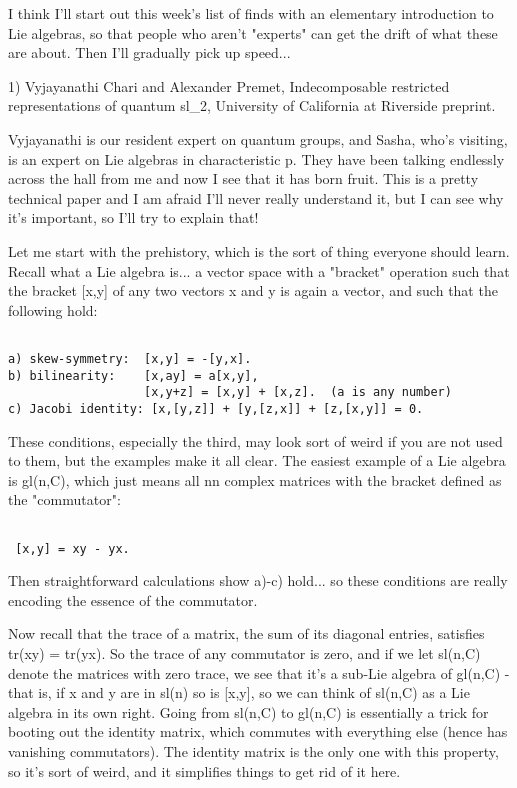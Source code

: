 

I think I'll start out this week's list of finds with an elementary
introduction to Lie algebras, so that people who aren't "experts" can
get the drift of what these are about.  Then I'll gradually pick up
speed...

1) Vyjayanathi Chari and Alexander Premet, Indecomposable restricted
representations of quantum sl_{2}, University of California at
Riverside preprint.

Vyjayanathi is our resident expert on quantum groups, and Sasha, who's
visiting, is an expert on Lie algebras in characteristic p.  They have
been talking endlessly across the hall from me and now I see that it has
born fruit.  This is a pretty technical paper and I am afraid I'll never
really understand it, but I can see why it's important, so I'll try to 
explain that!  

Let me start with the prehistory, which is the sort of thing everyone
should learn.  Recall what a Lie algebra is... a vector space
with a "bracket" operation such that the bracket [x,y] of any two vectors
x and y is again a vector, and such that the following hold:


\begin{verbatim}

a) skew-symmetry:  [x,y] = -[y,x].
b) bilinearity:    [x,ay] = a[x,y],  
                   [x,y+z] = [x,y] + [x,z].  (a is any number) 
c) Jacobi identity: [x,[y,z]] + [y,[z,x]] + [z,[x,y]] = 0.
\end{verbatim}
    

These conditions, especially the third, may look sort of weird if you
are not used to them, but the examples make it all clear.  The easiest
example of a Lie algebra is gl(n,C), which just means all n\times n complex
matrices with the bracket defined as the "commutator":


\begin{verbatim}

 [x,y] = xy - yx.  
\end{verbatim}
    

Then straightforward calculations show a)-c) hold... so these conditions
are really encoding the essence of the commutator.  

Now recall that the trace of a matrix, the sum of its diagonal entries,
satisfies tr(xy) = tr(yx).  So the trace of any commutator is zero, and
if we let sl(n,C) denote the matrices with zero trace, we see that it's a
sub-Lie algebra of gl(n,C) - that is, if x and y are in sl(n) so is [x,y],
so we can think of sl(n,C) as a Lie algebra in its own right.  Going from
sl(n,C) to gl(n,C) is essentially a trick for booting out the identity
matrix, which commutes with everything else (hence has vanishing
commutators).  The identity matrix is the only one with this property,
so it's sort of weird, and it simplifies things to get rid of it here.  


